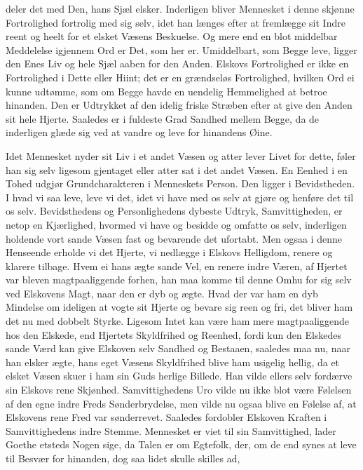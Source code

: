 \documentclass[12pt,a4paper]{book}
\newcommand{\apage}[1]{\marginnote{\footnotesize\textit{[#1]}}}
\begin{document}
deler det med Den, hans Sjæl elsker. Inderligen bliver Mennesket i
denne skjønne Fortrolighed fortrolig med sig selv, idet han længes efter
at fremlægge sit Indre reent og heelt for et elsket Væsens Beskuelse.
Og mere end en blot middelbar Meddelelse igjennem Ord er Det, som her
er. Umiddelbart, som Begge leve, ligger den Enes Liv og hele \apage{34} Sjæl aaben
for den Anden. Elskovs Fortrolighed er ikke en Fortrolighed i Dette
eller Hiint; det er en grændseløs Fortrolighed, hvilken Ord ei kunne
udtømme, som om Begge havde en uendelig Hemmelighed at betroe hinanden.
Den er Udtrykket af den idelig friske Stræben efter at give den Anden
sit hele Hjerte. Saaledes er i fuldeste Grad Sandhed mellem Begge, da
de inderligen glæde sig ved at vandre og leve for hinandens Øine.

Idet Mennesket nyder sit Liv i et andet Væsen og atter lever Livet for
dette, føler han sig selv ligesom gjentaget eller atter sat i det andet
Væsen. En Eenhed i en Tohed udgjør Grundcharakteren i Menneskets
Person. Den ligger i Bevidstheden. I hvad vi saa leve, leve vi det,
idet vi have med os selv at gjøre og henføre det til os selv.
Bevidsthedens og Personlighedens dybeste Udtryk, Samvittigheden, er
netop en Kjærlighed, hvormed vi have og besidde og omfatte os selv,
inderligen holdende vort sande Væsen fast og bevarende det ufortabt.
Men ogsaa i denne Henseende erholde vi det Hjerte, vi nedlægge i
Elskovs Helligdom, renere og klarere tilbage. Hvem ei hans ægte sande
Vel, en renere indre Væren, af Hjertet var bleven magtpaaliggende
forhen, han maa komme til denne Omhu for sig selv ved Elskovens Magt,
naar den er dyb og ægte. Hvad der var ham en dyb Mindelse om ideligen
at vogte sit Hjerte og bevare sig reen og fri, det bliver ham det nu
med dobbelt Styrke. \apage{35} Ligesom Intet kan være ham mere magtpaaliggende hos
den Elskede, end Hjertets Skyldfrihed og Reenhed, fordi kun den Elskedes
sande Værd kan give Elskoven selv Sandhed og Bestaaen, saaledes maa nu,
naar han elsker ægte, hans eget Væsens Skyldfrihed blive ham usigelig
hellig, da et elsket Væsen skuer i ham sin Guds herlige Billede. Han
vilde ellers selv fordærve sin Elskovs rene Skjønhed. Samvittighedens
Uro vilde nu ikke blot være Følelsen af den egne indre Freds
Sønderbrydelse, men vilde nu ogsaa blive en Følelse af, at Elskovens
rene Fred var sønderrevet. Saaledes fordobler Elskoven Kraften i
Samvittighedens indre Stemme. Mennesket er viet til sin Samvittighed,
lader Goethe etsteds Nogen sige, da Talen er om Egtefolk, der, om de end
synes at leve til Besvær for hinanden, dog saa lidet skulle skilles ad,
\end{document}
